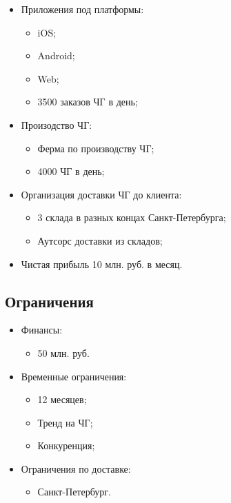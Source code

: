 \documentclass[a4paper,8pt]{article}
\begin{document}
    \begin{itemize}
      \item Приложения под платформы:
          \begin{itemize}
              \item iOS;
              \item Android;
              \item Web;
              \item 3500 заказов ЧГ в день;
          \end{itemize}
      \item Произодство ЧГ:
          \begin{itemize}
              \item Ферма по производству ЧГ;
              \item 4000 ЧГ в день;
          \end{itemize}
      \item Организация доставки ЧГ до клиента:
          \begin{itemize}
              \item 3 склада в разных концах Санкт-Петербурга;
              \item Аутсорс доставки из складов;
          \end{itemize}
      \item Чистая прибыль 10 млн. руб. в месяц.
    \end{itemize}

\subsection{Ограничения}

    \begin{itemize}
        \item Финансы:
            \begin{itemize}
                \item 50 млн. руб.
            \end{itemize}
        \item Временные ограничения:
            \begin{itemize}
                \item 12 месяцев;
                \item Тренд на ЧГ;
                \item Конкуренция;
            \end{itemize}
        \item Ограничения по доставке:
            \begin{itemize}
                \item Санкт-Петербург.
            \end{itemize}
    \end{itemize}
\end{document}
